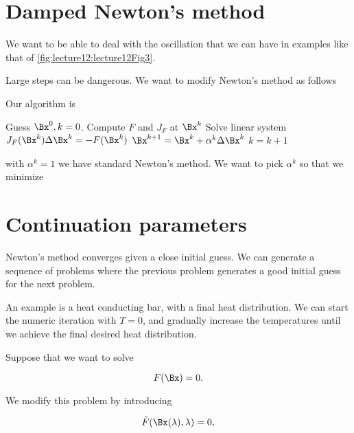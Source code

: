 \section{Damped Newton's method}

We want to be able to deal with the oscillation that we can have in examples like that of \cref{fig:lecture12:lecture12Fig3}.



Large steps can be dangerous.  We want to modify Newton's method as follows

Our algorithm is
\begin{algorithmic}
\STATE Guess \( \Bx^0, k = 0 \).
\REPEAT
\STATE Compute \( F \) and \( J_F \) at \( \Bx^k \)
\STATE Solve linear system  \( J_F(\Bx^k) \Delta \Bx^k = - F(\Bx^k) \)
\STATE \( \Bx^{k+1} = \Bx^k + \alpha^k \Delta \Bx^k \)
\STATE \( k = k + 1 \)
\end{algorithmic}

with \( \alpha^k = 1 \) we have standard Newton's method.  We want to pick \( \alpha^k \) so that we minimize

\section{Continuation parameters}

Newton's method converges given a close initial guess.  We can generate a sequence of problems where the previous problem generates a good initial guess for the next problem.

An example is a heat conducting bar, with a final heat distribution.  We can start the numeric iteration with \( T = 0 \), and gradually increase the temperatures until we achieve the final desired heat distribution.

Suppose that we want to solve 

\begin{equation}\label{eqn:multiphysicsL12:340}
F(\Bx) = 0.
\end{equation}

We modify this problem by introducing

\begin{equation}\label{eqn:multiphysicsL12:360}
\tilde{F}(\Bx(\lambda), \lambda) = 0,
\end{equation}

